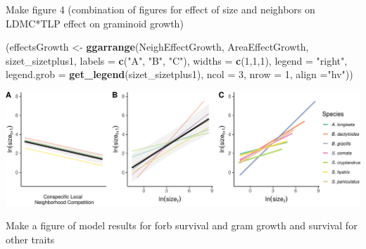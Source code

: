 \documentclass[
]{article}
\newenvironment{Shaded}{\begin{snugshade}}{\end{snugshade}}
\newcommand{\DataTypeTok}[1]{\textcolor[rgb]{0.13,0.29,0.53}{#1}}
\newcommand{\DecValTok}[1]{\textcolor[rgb]{0.00,0.00,0.81}{#1}}
\newcommand{\KeywordTok}[1]{\textcolor[rgb]{0.13,0.29,0.53}{\textbf{#1}}}
\newcommand{\NormalTok}[1]{#1}
\newcommand{\StringTok}[1]{\textcolor[rgb]{0.31,0.60,0.02}{#1}}
\begin{document}
Make figure 4 (combination of figures for effect of size and neighbors
on LDMC*TLP effect on graminoid growth)

\begin{Shaded}
\begin{Highlighting}[]
\NormalTok{(effectsGrowth \textless{}{-}}\StringTok{ }\KeywordTok{ggarrange}\NormalTok{(NeighEffectGrowth, AreaEffectGrowth,  sizet\_sizetplus1,}
          \DataTypeTok{labels =} \KeywordTok{c}\NormalTok{(}\StringTok{"A"}\NormalTok{, }\StringTok{"B"}\NormalTok{, }\StringTok{"C"}\NormalTok{),}
          \DataTypeTok{widths =} \KeywordTok{c}\NormalTok{(}\DecValTok{1}\NormalTok{,}\DecValTok{1}\NormalTok{,}\DecValTok{1}\NormalTok{),}
           \DataTypeTok{legend =} \StringTok{"right"}\NormalTok{,}
          \DataTypeTok{legend.grob =} \KeywordTok{get\_legend}\NormalTok{(sizet\_sizetplus1),}
          \DataTypeTok{ncol =} \DecValTok{3}\NormalTok{, }\DataTypeTok{nrow =} \DecValTok{1}\NormalTok{, }\DataTypeTok{align =}\StringTok{"hv"}\NormalTok{))}
\end{Highlighting}
\end{Shaded}

\includegraphics{figures/growthEffectPlots-1.pdf}

Make a figure of model results for forb survival and gram growth and
survival for other traits
\end{document}
